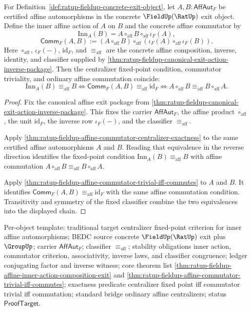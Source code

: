 \begin{theorem}
\label{thm:ratup-fieldup-affine-centralizer-fixed-point-criterion}
For Definition~\ref{def:ratup-fieldup-concrete-exit-object}, let
$A,B:\mathsf{AffAut}_F$ be certified affine automorphisms in the concrete
$\FieldUp(\RatUp)$ exit object. Define the inner affine action of $A$ on $B$
and the concrete affine commutator by
$$
\mathrm{Inn}_A(B)=A\circ_{\mathrm{aff}}B\circ_{\mathrm{aff}}\iota_F(A),
$$
$$
\mathsf{Comm}_F(A,B):=(A\circ_{\mathrm{aff}}B)\circ_{\mathrm{aff}}
(\iota_F(A)\circ_{\mathrm{aff}}\iota_F(B)).
$$
Here $\circ_{\mathrm{aff}}$, $\iota_F(-)$, $\mathrm{id}_F$, and
$\equiv_{\mathrm{aff}}$ are the concrete affine composition, inverse,
identity, and classifier supplied by
\autoref{thm:ratup-fieldup-canonical-exit-action-inverse-package}. Then
the centralizer fixed-point condition, commutator triviality, and ordinary
affine commutation coincide:
$$
\mathrm{Inn}_A(B)\equiv_{\mathrm{aff}}B
\Longleftrightarrow
\mathsf{Comm}_F(A,B)\equiv_{\mathrm{aff}}\mathrm{id}_F
\Longleftrightarrow
A\circ_{\mathrm{aff}}B\equiv_{\mathrm{aff}}B\circ_{\mathrm{aff}}A.
$$
\end{theorem}
\begin{proof}
Fix the canonical affine exit package from
\autoref{thm:ratup-fieldup-canonical-exit-action-inverse-package}. This fixes
the carrier $\mathsf{AffAut}_F$, the affine product $\circ_{\mathrm{aff}}$,
the unit $\mathrm{id}_F$, the inverse row $\iota_F(-)$, and the classifier
$\equiv_{\mathrm{aff}}$.

Apply
\autoref{thm:ratup-fieldup-affine-commutator-centralizer-exactness} to the same
certified affine automorphisms $A$ and $B$. Reading that equivalence in the
reverse direction identifies the fixed-point condition
$\mathrm{Inn}_A(B)\equiv_{\mathrm{aff}}B$ with affine commutation
$A\circ_{\mathrm{aff}}B\equiv_{\mathrm{aff}}B\circ_{\mathrm{aff}}A$.

Apply \autoref{thm:ratup-fieldup-affine-commutator-trivial-iff-commutes} to
$A$ and $B$. It identifies
$\mathsf{Comm}_F(A,B)\equiv_{\mathrm{aff}}\mathrm{id}_F$ with the same affine
commutation condition. Transitivity and symmetry of the fixed classifier
combine the two equivalences into the displayed chain.
\end{proof}

Per-object template: traditional target centralizer fixed-point criterion for
inner affine automorphisms; BEDC source concrete $\FieldUp(\RatUp)$ exit plus
$\GroupUp$; carrier $\mathsf{AffAut}_F$; classifier
$\equiv_{\mathrm{aff}}$; stability obligations inner action, commutator
criterion, associativity, inverse laws, and classifier congruence; ledger
conjugating factor and inverse witness; core theorem list
\autoref{thm:ratup-fieldup-affine-inner-action-composition-exit} and
\autoref{thm:ratup-fieldup-affine-commutator-trivial-iff-commutes}; exactness
predicate centralizer fixed point iff commutator trivial iff commutation;
standard bridge ordinary affine centralizers; status $\mathsf{ProofTarget}$.

